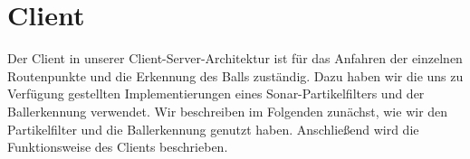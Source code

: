 \section{Client}
\label{sec:client}
Der Client in unserer Client-Server-Architektur ist für das Anfahren der
einzelnen Routenpunkte und die Erkennung des Balls zuständig. Dazu haben
wir die uns zu Verfügung gestellten Implementierungen
eines Sonar-Partikelfilters und der Ballerkennung
verwendet. Wir beschreiben
im Folgenden zunächst, wie wir den Partikelfilter und die
Ballerkennung genutzt haben. Anschließend wird die Funktionsweise des
Clients beschrieben.








